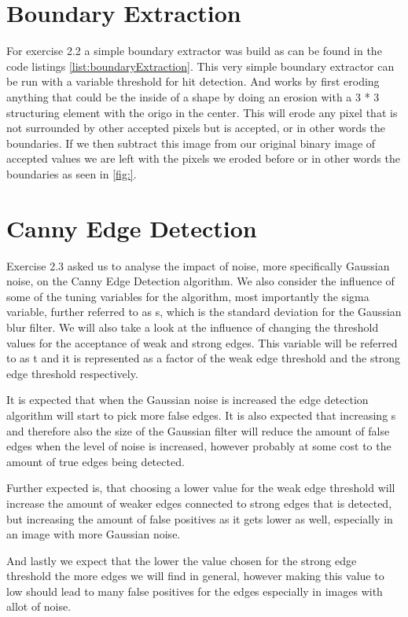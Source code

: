 \documentclass[10pt,a4paper]{article}
\begin{document}
\section{Boundary Extraction}
For exercise 2.2 a simple boundary extractor was build as can be found in the code listings \ref{list:boundaryExtraction}. This very simple boundary extractor can be run with a variable threshold for hit detection. And works by first eroding anything that could be the inside of a shape by doing an erosion with a 3 * 3 structuring element with the origo in the center. This will erode any pixel that is not surrounded by other accepted pixels but is accepted, or in other words the boundaries. If we then subtract this image from our original binary image of accepted values we are left with the pixels we eroded before or in other words the boundaries as seen in \ref{fig:}.

\section{Canny Edge Detection}
Exercise 2.3 asked us to analyse the impact of noise, more specifically Gaussian noise, on the Canny Edge Detection algorithm. We also consider the influence of some of the tuning variables for the algorithm, most importantly the sigma variable, further referred to as s, which is the standard deviation for the Gaussian blur filter. We will also take a  look at the influence of changing the threshold values for the acceptance of weak and strong edges. This variable will be referred to as t and it is represented as a factor of the weak edge threshold and the strong edge threshold respectively.

It is expected that when the Gaussian noise is increased the edge detection algorithm will start to pick more false edges. It is also expected that increasing s and therefore also the size of the Gaussian filter will reduce the amount of false edges when the level of noise is increased, however probably at some cost to the amount of true edges being detected.

Further expected is, that choosing a lower value for the weak edge threshold will increase the amount of weaker edges connected to strong edges that is detected, but increasing the amount of false positives as it gets lower as well, especially in an image with more Gaussian noise. 

And lastly we expect that the lower the value chosen for the strong edge threshold the more edges we will find in general, however making this value to low should lead to many false positives for the edges especially in images with allot of noise.
\end{document}
